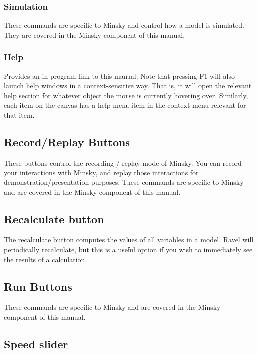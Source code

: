 \subsubsection{Simulation}
These commands are specific to Minsky and control how a model is simulated. They are covered in the Minsky component of this manual.
\subsubsection{Help}
\label{Help}

Provides an in-program link to this manual. Note that pressing F1 will also launch help windows in a context-sensitive way. That is, it will open the relevant help section for whatever object the mouse is currently hovering over. Similarly, each item on the canvas has a help menu item in the context menu relevant for that item.

\subsection{Record/Replay Buttons}
\label{RecReplayButtons}


These buttons control the recording / replay mode of Minsky. You can record your interactions with Minsky, and replay those interactions for demonstration/presentation purposes. These commands are specific to Minsky and are covered in the Minsky component of this manual.

\subsection{Recalculate button}
\label {Recalculate}


The recalculate button computes the values of all variables in a model. Ravel will periodically recalculate, but this is a useful option if you wish to immediately see the results of a calculation.

\subsection{Run Buttons}
\label{RunButtons}


These commands are specific to Minsky and are covered in the Minsky component of this manual.


\subsection{Speed slider}
\label{Speedslider}

